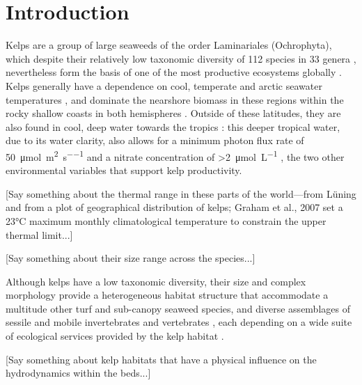\documentclass[utf8]{frontiersSCNS} %
\begin{document}
\section{Introduction}
Kelps are a group of large seaweeds of the order Laminariales (Ochrophyta), which despite their relatively low taxonomic diversity of \num{112} species in \num{33} genera \citep{bolton2010}, nevertheless form the basis of one of the most productive ecosystems globally \citep{mann1973}. Kelps generally have a dependence on cool, temperate and arctic seawater temperatures \citep{santelices2007,bolton2010}, and dominate the nearshore biomass in these regions within the rocky shallow coasts in both hemispheres \citep{steneck2002}. Outside of these latitudes, they are also found in cool, deep water towards the tropics \citep{graham2007}: this deeper tropical water, due to its water clarity, also allows for a minimum photon flux rate of \SI{50}{\micro\mol\per\meter\squared\per\second} and a nitrate concentration of \SI{>2}{\micro\mole\per\liter} \citep{luning1990,dayton1999,zimmerman1985}, the two other environmental variables that support kelp productivity.

[Say something about the thermal range in these parts of the world---from Lüning and from a plot of geographical distribution of kelps; Graham et al., 2007 set a 23°C maximum monthly climatological temperature to constrain the upper thermal limit...]

[Say something about their size range across the species...]

Although kelps have a low taxonomic diversity, their size and complex morphology provide a heterogeneous habitat structure \citep{steneck2002} that accommodate a multitude other turf and sub-canopy seaweed species, and diverse assemblages of sessile and mobile invertebrates and vertebrates \citep{mann1973,dunton1987,duggins1989,steneck2002}, each depending on a wide suite of ecological services provided by the kelp habitat \citep{gaines1987,bologna1993,levin1994,anderson1997}.

[Say something about kelp habitats that have a physical influence on the hydrodynamics within the beds...]
\end{document}
